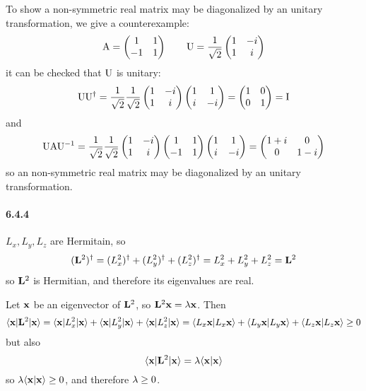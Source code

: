 \documentclass[a4paper]{article}
\begin{document}
To show a non-symmetric real matrix may be diagonalized by an unitary transformation, we give a counterexample:
\[
\mathrm{A}=
\begin{pmatrix}
1&1\\
-1&1
\end{pmatrix}\qquad \mathrm{U}=\frac{1}{\sqrt{2}}
\begin{pmatrix}
1&-i\\
1&i
\end{pmatrix}
\]
it can be checked that $\mathrm{U}$ is unitary:
\[
\mathrm{U}\mathrm{U}^\dagger=
\frac{1}{\sqrt{2}}\frac{1}{\sqrt{2}}
\begin{pmatrix}
1&-i\\1&i
\end{pmatrix}
\begin{pmatrix}
1&1\\
i&-i
\end{pmatrix}=
\begin{pmatrix}
1&0\\0&1
\end{pmatrix}=\mathrm{I}
\]
and
\[
\mathrm{U}\mathrm{A}\mathrm{U}^{-1}=
\frac{1}{\sqrt{2}}\frac{1}{\sqrt{2}}
\begin{pmatrix}
1&-i\\1&i
\end{pmatrix}
\begin{pmatrix}
1&1\\
-1&1
\end{pmatrix}
\begin{pmatrix}
1&1\\
i&-i
\end{pmatrix}=
\begin{pmatrix}
1+i&0\\
0&1-i
\end{pmatrix}
\]
so an non-symmetric real matrix may be diagonalized by an unitary transformation.

\paragraph{6.4.4}
$L_x,L_y,L_z$ are Hermitain, so
\[
(\mathbf{L}^2)^\dagger=(L_x^2)^\dagger+(L_y^2)^\dagger+(L_z^2)^\dagger=L_x^2+L_y^2+L_z^2=\mathbf{L}^2
\]
so $\mathbf{L}^2$ is Hermitian, and therefore its eigenvalues are real.
\medskip

Let $\mathbf{x}$ be an eigenvector of $\mathbf{L}^2$, so $\mathbf{L}^2\mathbf{x}=\lambda\mathbf{x}$. Then
\[
\langle\mathbf{x}|\mathbf{L}^2|\mathbf{x}\rangle=\langle\mathbf{x}|L_x^2|\mathbf{x}\rangle+\langle\mathbf{x}|L_y^2|\mathbf{x}\rangle+\langle\mathbf{x}|L_z^2|\mathbf{x}\rangle=\langle L_x\mathbf{x}|L_x\mathbf{x}\rangle+\langle L_y\mathbf{x}|L_y\mathbf{x}\rangle+\langle L_z\mathbf{x}|L_z\mathbf{x}\rangle\geq0
\]
but also
\[
\langle\mathbf{x}|\mathbf{L}^2|\mathbf{x}\rangle=\lambda\langle\mathbf{x}|\mathbf{x}\rangle
\]
so $\lambda\langle\mathbf{x}|\mathbf{x}\rangle\geq0$, and therefore $\lambda\geq0$.
\end{document}
